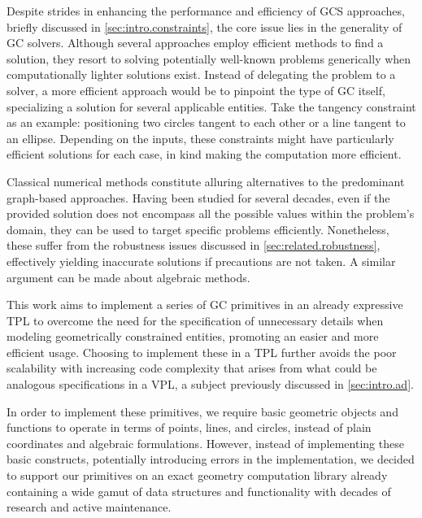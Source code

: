 %
\label{chap:solution}
\cleardoublepage{}

\noindent Despite strides in enhancing the performance and efficiency of
\ac{GCS} approaches, briefly discussed in \cref{sec:intro.constraints}, the core
issue lies in the generality of \ac{GC} solvers.  Although several approaches
employ efficient methods to find a solution, they resort to solving potentially
well-known problems generically when computationally lighter solutions exist.
Instead of delegating the problem to a solver, a more efficient approach would
be to pinpoint the type of \ac{GC} itself, specializing a solution for several
applicable entities.  Take the tangency constraint as an example: positioning
two circles tangent to each other or a line tangent to an ellipse.  Depending on
the inputs, these constraints might have particularly efficient solutions for
each case, in kind making the computation more efficient.

Classical numerical methods constitute alluring alternatives to the predominant
graph-based approaches.  Having been studied for several decades, even if the
provided solution does not encompass all the possible values within the
problem's domain, they can be used to target specific problems efficiently.
Nonetheless, these suffer from the robustness issues discussed in
\cref{sec:related.robustness}, effectively yielding inaccurate solutions if
precautions are not taken.  A similar argument can be made about algebraic
methods.

This work aims to implement a series of \ac{GC} primitives in an already
expressive \ac{TPL} to overcome the need for the specification of unnecessary
details when modeling geometrically constrained entities, promoting an easier
and more efficient usage.  Choosing to implement these in a \ac{TPL} further
avoids the poor scalability with increasing code complexity that arises from
what could be analogous specifications in a \ac{VPL}, a subject previously
discussed in \cref{sec:intro.ad}.

In order to implement these primitives, we require basic geometric objects and
functions to operate in terms of points, lines, and circles, instead of plain
coordinates and algebraic formulations.  However, instead of implementing these
basic constructs, potentially introducing errors in the implementation, we
decided to support our primitives on an exact geometry computation library
already containing a wide gamut of data structures and functionality with
decades of research and active maintenance.

